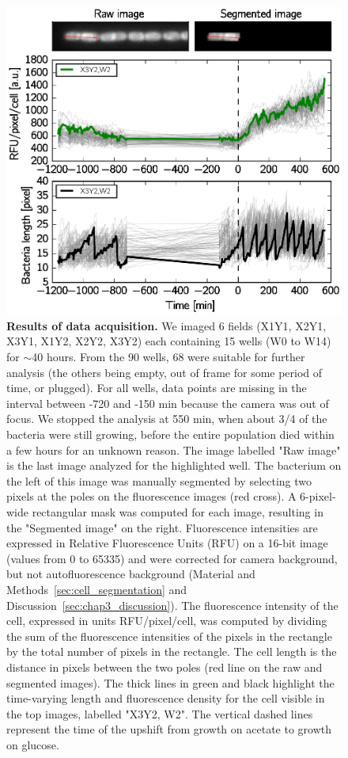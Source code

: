 \begin{figure}[p]
\centering
\includegraphics[scale=1]{./Fig/data_acquisition}
\caption{
\textbf{Results of data acquisition.}
We imaged 6 fields (X1Y1, X2Y1, X3Y1, X1Y2, X2Y2, X3Y2) each containing 15 wells (W0 to W14) for $\sim$40 hours.
From the 90 wells, 68 were suitable for further analysis (the others being empty, out of frame for some period of time, or plugged).
For all wells, data points are missing in the interval between -720 and -150 min because the camera was out of focus.
We stopped the analysis at 550 min, when about 3/4 of the bacteria were still growing, before the entire population died within a few hours for an unknown reason.
The image labelled "Raw image" is the last image analyzed for the highlighted well.
The bacterium on the left of this image was manually segmented by selecting two pixels at the poles on the fluorescence images (red cross).
A 6-pixel-wide rectangular mask was computed for each image, resulting in the "Segmented image" on the right.
Fluorescence intensities are expressed in Relative Fluorescence Units (RFU) on a 16-bit image (values from 0 to 65335) and were corrected for camera background, but not autofluorescence background (Material and Methods~\ref{sec:cell_segmentation} and Discussion~\ref{sec:chap3_discussion}).
The fluorescence intensity of the cell, expressed in units RFU/pixel/cell, was computed by dividing the sum of the fluorescence intensities of the pixels in the rectangle by the total number of pixels in the rectangle.
The cell length is the distance in pixels between the two poles (red line on the raw and segmented images).
The thick lines in green and black highlight the time-varying length and fluorescence density for the cell visible in the top images, labelled "X3Y2, W2".
The vertical dashed lines represent the time of the upshift from growth on acetate to growth on glucose.
}
\label{fig:data_acquisition}
\end{figure}

